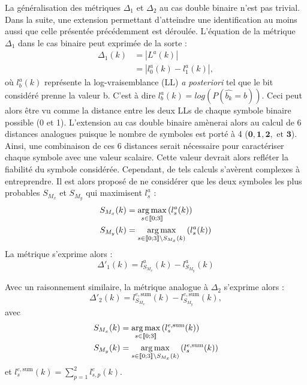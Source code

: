 La généralisation des métriques $\Delta_1$ et $\Delta_2$ au cas double binaire n'est pas trivial. Dans la suite, une 
extension permettant d'atteindre une identification au moins aussi que celle présentée précédemment est déroulée.
L'équation de la métrique $\Delta_1$ dans le cas binaire peut exprimée de la sorte : 
\begin{align*}
\Delta_1(k) &= |L^a(k)|\\
			&= |l^a_0(k)-l^a_1(k)|,
\end{align*}
où $l^a_b(k)$ représente la log-vraisemblance (LL) \textit{a posteriori} tel que le bit considéré prenne la valeur b. C'est à dire
$l^a_b(k) = log\left(P(\hat{b_k} = b)\right)$. Ceci peut alors être vu comme la distance entre les deux LLs de chaque symbole
binaire possible (0 et 1). L'extension au cas double binaire amènerai alors au calcul de 6 distances analogues puisque le
nombre de symboles est porté à 4 ($\mathbf{0}, \mathbf{1}, \mathbf{2}, \text{~et~} \mathbf{3}$). Ainsi, une combinaison 
de ces 6 distances serait nécessaire pour caractériser chaque symbole avec une valeur scalaire. Cette valeur devrait alors 
refléter la fiabilité du symbole considérée. Cependant, de tels calculs s'avèrent complexes à entreprendre. Il est alors 
proposé de ne considérer que les deux symboles les plus probables $S_{M_x}$ et $S_{M_y}$ qui maximisent $l^a_s$ :
\begin{align*}
S_{M_x}(k) &= \operatorname*{arg\,max}\limits_{s\in\llbracket0;3\rrbracket}\left(l^a_s(k)\right) \\
S_{M_y}(k) &= \operatorname*{arg\,max}\limits_{s\in\llbracket0;3\rrbracket\setminus{S_{M_x}(k)}}\left(l^a_s(k)\right)
\end{align*}
La métrique s'exprime alors :
\begin{equation}
	\Delta'_1(k) = l^a_{S_{M_x}}(k)-l^a_{S_{M_y}}(k)
\end{equation}

Avec un raisonnement similaire, la métrique analogue à $\Delta_2$ s'exprime alors : 
\begin{equation}
	\Delta'_2(k) = l^{e,\text{sum}}_{S_{M_x}}(k)-l^{e,\text{sum}}_{S_{M_y}}(k),
\end{equation}
avec
\begin{align*}
S_{M_x}(k) &= \operatorname*{arg\,max}\limits_{s\in\llbracket0;3\rrbracket}\left(l^{e,\text{sum}}_s(k)\right) \\
S_{M_y}(k) &= \operatorname*{arg\,max}\limits_{s\in\llbracket0;3\rrbracket\setminus{S_{M_x}(k)}}\left(l^{e,\text{sum}}_s(k)\right)
\end{align*}
et $l^{e,\text{sum}}_s(k) = \sum\limits_{p=1}^2l^e_{s,p}(k)$.

